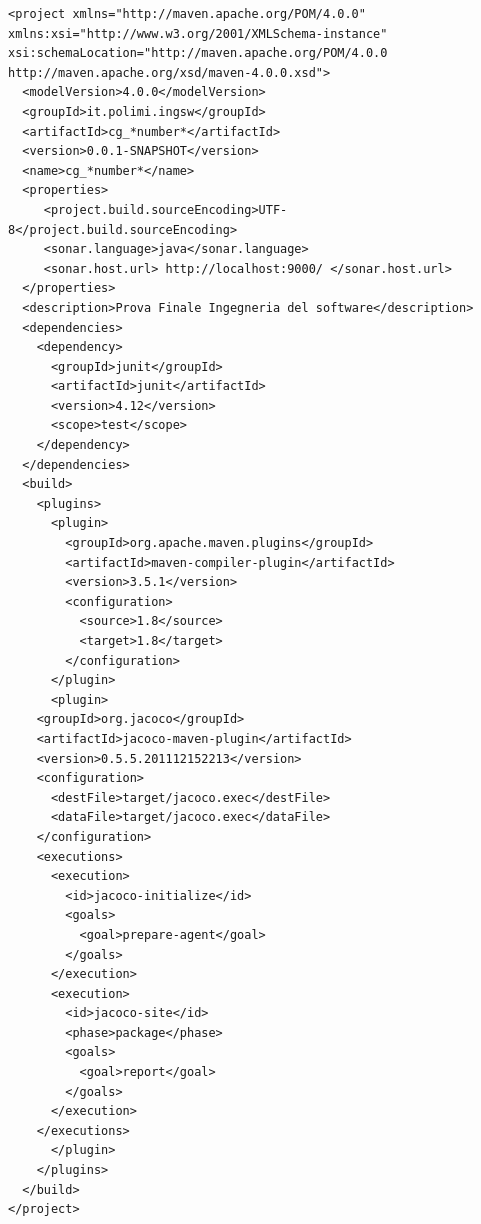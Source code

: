 \documentclass{article}
\begin{document}
\begin{lstlisting}
<project xmlns="http://maven.apache.org/POM/4.0.0" xmlns:xsi="http://www.w3.org/2001/XMLSchema-instance" xsi:schemaLocation="http://maven.apache.org/POM/4.0.0 http://maven.apache.org/xsd/maven-4.0.0.xsd">
  <modelVersion>4.0.0</modelVersion>
  <groupId>it.polimi.ingsw</groupId> 
  <artifactId>cg_*number*</artifactId> 
  <version>0.0.1-SNAPSHOT</version>
  <name>cg_*number*</name>
  <properties>
     <project.build.sourceEncoding>UTF-8</project.build.sourceEncoding>
     <sonar.language>java</sonar.language>
     <sonar.host.url> http://localhost:9000/ </sonar.host.url>
  </properties>
  <description>Prova Finale Ingegneria del software</description>
  <dependencies>
    <dependency>
      <groupId>junit</groupId>
      <artifactId>junit</artifactId>
      <version>4.12</version>
      <scope>test</scope>
    </dependency>
  </dependencies>
  <build>
    <plugins>
      <plugin>
        <groupId>org.apache.maven.plugins</groupId>
        <artifactId>maven-compiler-plugin</artifactId>
        <version>3.5.1</version>
        <configuration>
          <source>1.8</source>
          <target>1.8</target>
        </configuration>
      </plugin>
      <plugin>
	<groupId>org.jacoco</groupId>
	<artifactId>jacoco-maven-plugin</artifactId>
	<version>0.5.5.201112152213</version>
	<configuration>
	  <destFile>target/jacoco.exec</destFile>
	  <dataFile>target/jacoco.exec</dataFile>
	</configuration>
	<executions>
	  <execution>
	    <id>jacoco-initialize</id>
	    <goals>
	      <goal>prepare-agent</goal>
	    </goals>
	  </execution>
	  <execution>
	    <id>jacoco-site</id>
	    <phase>package</phase>
	    <goals>
	      <goal>report</goal>
	    </goals>
	  </execution>
	</executions>
      </plugin>
    </plugins>
  </build>
</project>
\end{lstlisting}
\end{document}
